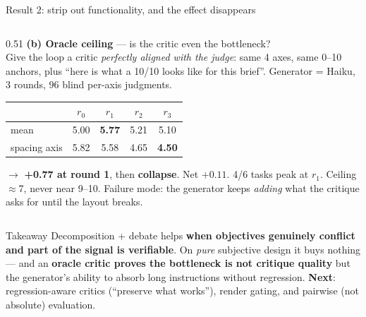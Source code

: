 \documentclass[aspectratio=169,10pt]{beamer}
\newcommand{\hl}[1]{\textbf{\color{navymain}#1}}
\newcommand{\bad}[1]{\textbf{\color{accentred}#1}}
\newcommand{\gd}[1]{\textbf{\color{winner}#1}}
\begin{document}
\begin{frame}{Result 2: strip out functionality, and the effect disappears}
\begin{columns}[T,onlytextwidth]
\begin{column}{0.51\textwidth}
\textbf{\color{navymain}(b) Oracle ceiling} --- is the critic even the bottleneck?\\
Give the loop a critic \emph{perfectly aligned with the judge}:
same 4 axes, same 0--10 anchors, plus ``here is what a 10/10 looks like for this brief''.
Generator = Haiku, 3 rounds, 96 blind per-axis judgments.
\begin{center}
\begin{tabular}{@{}lcccc@{}}
\toprule
 & $r_0$ & $r_1$ & $r_2$ & $r_3$ \\
\midrule
mean & 5.00 & \gd{5.77} & 5.21 & 5.10 \\
spacing axis & 5.82 & 5.58 & 4.65 & \bad{4.50} \\
\bottomrule
\end{tabular}
\end{center}
\vspace{0.2em}
$\rightarrow$ \gd{+0.77 at round 1}, then \bad{collapse}. Net $+0.11$.
4/6 tasks peak at $r_1$. Ceiling $\approx$7, never near 9--10.
Failure mode: the generator keeps \emph{adding} what the critique asks for
until the layout breaks.
\end{column}
\end{columns}

\vspace{0.4em}
\begin{block}{\scriptsize Takeaway}
\scriptsize
Decomposition + debate helps \hl{when objectives genuinely conflict and part of the signal is verifiable}.
On \emph{pure} subjective design it buys nothing --- and an \hl{oracle critic proves the bottleneck is
not critique quality} but the generator's ability to absorb long instructions without regression.
\bad{Next}: regression-aware critics (``preserve what works''), render gating, and pairwise
(not absolute) evaluation.
\end{block}
\end{frame}
\end{document}
